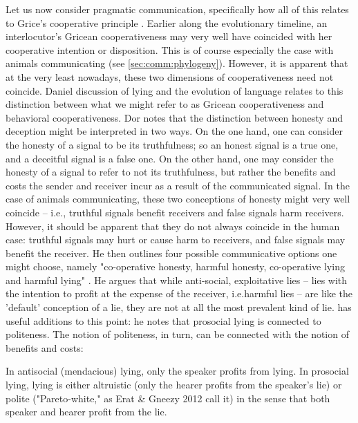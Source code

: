 Let us now consider pragmatic communication, specifically how all of this relates to Grice's cooperative principle .
Earlier along the evolutionary timeline, an interlocutor's Gricean cooperativeness may very well have coincided with her cooperative intention or disposition. This is of course especially the case with animals communicating (see \cref{sec:comm:phylogeny}).
However, it is apparent that at the very least nowadays, these two dimensions of cooperativeness need not coincide.
Daniel  discussion of lying and the evolution of language relates to this distinction between what we might refer to as Gricean cooperativeness and behavioral cooperativeness.
Dor notes that the distinction between honesty and deception might be interpreted in two ways. On the one hand, one can consider the honesty of a signal to be its truthfulness; so an honest signal is a true one, and a deceitful signal is a false one. On the other hand, one may consider the honesty of a signal to refer to not its truthfulness, but rather the benefits and costs the sender and receiver incur as a result of the communicated signal. In the case of animals communicating, these two conceptions of honesty might very well coincide -- i.e., truthful signals benefit receivers and false signals harm receivers. However, it should be apparent that they do not always coincide in the human case: truthful signals may hurt or cause harm to receivers, and false signals may benefit the receiver. 
He then outlines four possible communicative options one might choose, namely "co-operative honesty, harmful honesty, co-operative lying and harmful lying" \citep[p.~45]{Dor17}.
He argues that while anti-social, exploitative lies -- lies with the intention to profit at the expense of the receiver, i.e.\@ harmful lies -- are like the 'default' conception of a lie, they are not at all the most prevalent kind of lie. \citet{Meibauer18} has useful additions to this point: he notes that prosocial lying is connected to politeness. The notion of politeness, in turn, can be connected with the notion of benefits and costs:
\begin{quoting}
    In antisocial (mendacious) lying, only the speaker profits from lying. In prosocial lying, lying is either altruistic (only the hearer profits from the speaker's lie) or polite ("Pareto-white," as Erat \& Gneezy 2012 call it) in the sense that both speaker and hearer profit from the lie.
    \hfill \citep[p.~371]{Meibauer18}
\end{quoting}

